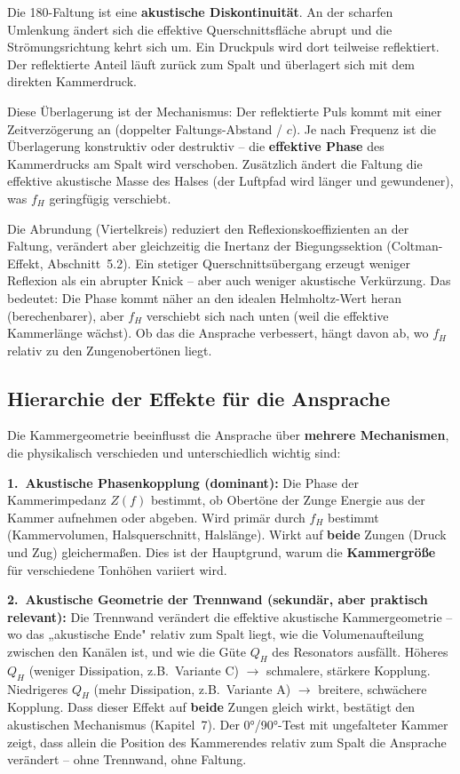 \documentclass[11pt,a4paper]{article}
\begin{document}
Die 180\textdegree{}-Faltung ist eine \textbf{akustische Diskontinuität}. An der scharfen Umlenkung ändert sich die effektive Querschnittsfläche abrupt und die Strömungsrichtung kehrt sich um. Ein Druckpuls wird dort teilweise reflektiert. Der reflektierte Anteil läuft zurück zum Spalt und überlagert sich mit dem direkten Kammerdruck.

Diese Überlagerung ist der Mechanismus: Der reflektierte Puls kommt mit einer Zeitverzögerung an (doppelter Faltungs-Abstand / $c$). Je nach Frequenz ist die Überlagerung konstruktiv oder destruktiv -- die \textbf{effektive Phase} des Kammerdrucks am Spalt wird verschoben. Zusätzlich ändert die Faltung die effektive akustische Masse des Halses (der Luftpfad wird länger und gewundener), was $f_H$ geringfügig verschiebt.

Die Abrundung (Viertelkreis) reduziert den Reflexionskoeffizienten an der Faltung, verändert aber gleichzeitig die Inertanz der Biegungssektion (Coltman-Effekt, Abschnitt~5.2). Ein stetiger Querschnittsübergang erzeugt weniger Reflexion als ein abrupter Knick -- aber auch weniger akustische Verkürzung. Das bedeutet: Die Phase kommt näher an den idealen Helmholtz-Wert heran (berechenbarer), aber $f_H$ verschiebt sich nach unten (weil die effektive Kammerlänge wächst). Ob das die Ansprache verbessert, hängt davon ab, wo $f_H$ relativ zu den Zungenobertönen liegt.

\subsection{Hierarchie der Effekte für die Ansprache}

Die Kammergeometrie beeinflusst die Ansprache über \textbf{mehrere Mechanismen}, die physikalisch verschieden und unterschiedlich wichtig sind:

\textbf{1.\ Akustische Phasenkopplung (dominant):} Die Phase der Kammerimpedanz $Z(f)$ bestimmt, ob Obertöne der Zunge Energie aus der Kammer aufnehmen oder abgeben. Wird primär durch $f_H$ bestimmt (Kammervolumen, Halsquerschnitt, Halslänge). Wirkt auf \textbf{beide} Zungen (Druck und Zug) gleichermaßen. Dies ist der Hauptgrund, warum die \textbf{Kammergröße} für verschiedene Tonhöhen variiert wird.

\textbf{2.\ Akustische Geometrie der Trennwand (sekundär, aber praktisch relevant):} Die Trennwand verändert die effektive akustische Kammergeometrie -- wo das „akustische Ende" relativ zum Spalt liegt, wie die Volumenaufteilung zwischen den Kanälen ist, und wie die Güte $Q_H$ des Resonators ausfällt. Höheres $Q_H$ (weniger Dissipation, z.B.\ Variante C) $\to$ schmalere, stärkere Kopplung. Niedrigeres $Q_H$ (mehr Dissipation, z.B.\ Variante A) $\to$ breitere, schwächere Kopplung. Dass dieser Effekt auf \textbf{beide} Zungen gleich wirkt, bestätigt den akustischen Mechanismus (Kapitel~7). Der 0°/90°-Test mit ungefalteter Kammer zeigt, dass allein die Position des Kammerendes relativ zum Spalt die Ansprache verändert -- ohne Trennwand, ohne Faltung.
\end{document}
